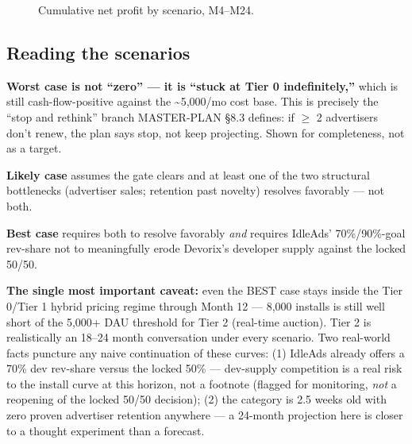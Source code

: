 \begin{figure}[htbp]
\centering
{}
\caption{Cumulative net profit by scenario, M4--M24.}
\label{fig:cumulative-net}
\end{figure}

\subsection*{Reading the scenarios}

\textbf{Worst case is not ``zero'' --- it is ``stuck at Tier 0 indefinitely,''} which is still cash-flow-positive against the \textasciitilde \textrm{\textrupee}5,000/mo cost base. This is precisely the ``stop and rethink'' branch MASTER-PLAN \S 8.3 defines: if \(\geq\) 2 advertisers don't renew, the plan says stop, not keep projecting. Shown for completeness, not as a target.

\textbf{Likely case} assumes the gate clears and at least one of the two structural bottlenecks (advertiser sales; retention past novelty) resolves favorably --- not both.

\textbf{Best case} requires both to resolve favorably \emph{and} requires IdleAds' 70\%/90\%-goal rev-share not to meaningfully erode Devorix's developer supply against the locked 50/50.

\textbf{The single most important caveat:} even the BEST case stays inside the Tier 0/Tier 1 hybrid pricing regime through Month 12 --- 8,000 installs is still well short of the 5,000+ DAU threshold for Tier 2 (real-time auction). Tier 2 is realistically an 18--24 month conversation under every scenario. Two real-world facts puncture any naive continuation of these curves: (1) IdleAds already offers a 70\% dev rev-share versus the locked 50\% --- dev-supply competition is a real risk to the install curve at this horizon, not a footnote (flagged for monitoring, \emph{not} a reopening of the locked 50/50 decision); (2) the category is 2.5 weeks old with zero proven advertiser retention anywhere --- a 24-month projection here is closer to a thought experiment than a forecast.

